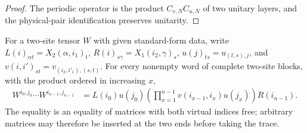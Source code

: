 \begin{proof}\leanok
    The periodic operator is the product $C_{v,N}C_{u,N}$ of two unitary
    layers, and the physical-pair identification preserves unitarity.
\end{proof}

\begin{lemma}
    \label{thm:mpu_two_site_open_word_factorization}
    \leanok
    For a two-site tensor $W$ with given standard-form data, write
    $L(i)_{\alpha t}=X_2(\alpha,i_1)_t$,
    $R(i)_{s\gamma}=X_1(i_2,\gamma)_s$,
    $u(j)_{ts}=u_{(t,s),j}$, and
    $v(i,i')_{st}=v_{(i_2,i'_1),(s,t)}$.
    For every nonempty word of complete two-site blocks, with the product
    ordered in increasing $x$,
    \begin{align}
        W^{i_0,j_0}\cdots W^{i_{n-1},j_{n-1}}
         & =L(i_0)u(j_0)
        \left(\prod_{x=1}^{n-1}v(i_{x-1},i_x)u(j_x)\right)R(i_{n-1}).
    \end{align}
    The equality is an equality of matrices with both virtual indices free;
    arbitrary matrices may therefore be inserted at the two ends before
    taking the trace.
\end{lemma}

